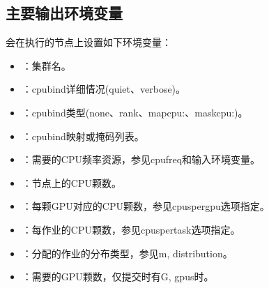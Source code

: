 \documentclass[a4paper,12pt,english]{sphinxmanual}
\begin{document}
\subsection{主要输出环境变量}
\label{\detokenize{slurm/slurm:id22}}
\sphinxAtStartPar
{}会在执行的节点上设置如下环境变量：
\begin{itemize}
\item {} 
\sphinxAtStartPar
{}：集群名。

\item {} 
\sphinxAtStartPar
{}：\sphinxhyphen{}\sphinxhyphen{}cpu\sphinxhyphen{}bind详细情况(quiet、verbose)。

\item {} 
\sphinxAtStartPar
{}：\sphinxhyphen{}\sphinxhyphen{}cpu\sphinxhyphen{}bind类型(none、rank、map\sphinxhyphen{}cpu:、mask\sphinxhyphen{}cpu:)。

\item {} 
\sphinxAtStartPar
{}：\sphinxhyphen{}\sphinxhyphen{}cpu\sphinxhyphen{}bind映射或掩码列表。

\item {} 
\sphinxAtStartPar
{}：需要的CPU频率资源，参见\sphinxhyphen{}\sphinxhyphen{}cpu\sphinxhyphen{}freq和输入环境变量。

\item {} 
\sphinxAtStartPar
{}：节点上的CPU颗数。

\item {} 
\sphinxAtStartPar
{}：每颗GPU对应的CPU颗数，参见\sphinxhyphen{}\sphinxhyphen{}cpus\sphinxhyphen{}per\sphinxhyphen{}gpu选项指定。

\item {} 
\sphinxAtStartPar
{}：每作业的CPU颗数，参见\sphinxhyphen{}\sphinxhyphen{}cpus\sphinxhyphen{}per\sphinxhyphen{}task选项指定。

\item {} 
\sphinxAtStartPar
{}：分配的作业的分布类型，参见\sphinxhyphen{}m, \sphinxhyphen{}\sphinxhyphen{}distribution。

\item {} 
\sphinxAtStartPar
{}：需要的GPU颗数，仅提交时有\sphinxhyphen{}G, \sphinxhyphen{}\sphinxhyphen{}gpus时。


\end{itemize}
\end{document}
